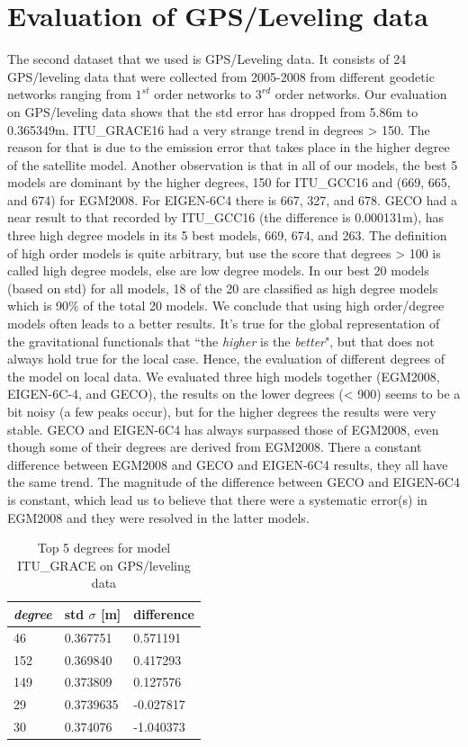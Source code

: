         \section{Evaluation of GPS/Leveling data}
        The second dataset that we used is GPS/Leveling data. It consists of 24 GPS/leveling data that were collected from 2005-2008 from different geodetic networks ranging from $1^{st}$ order networks to $3^{rd}$ order networks. Our evaluation on GPS/leveling data shows that the std error has dropped from 5.86m to 0.365349m. ITU\_GRACE16 had a very strange trend in degrees > 150. The reason for that is due to the emission error that takes place in the higher degree of the satellite model.
        Another observation is that in all of our models, the best 5 models are dominant by the higher degrees, 150 for ITU\_GCC16 and (669, 665, and 674) for EGM2008. For EIGEN-6C4 there is 667, 327, and 678. GECO had a near result to that recorded by ITU\_GCC16 (the difference is 0.000131m), has three high degree models in its 5 best models, 669, 674, and 263. The definition of high order models is quite arbitrary, but use the score that degrees > 100 is called high degree models, else are low degree models. In our best 20 models (based on std) for all models, 18 of the 20 are classified as high degree models which is 90\% of the total 20 models. We conclude that using high order/degree models often leads to a better results. It's true for the global representation of the gravitational functionals that ``the \textit{higher} is the \textit{better}", but that does not always hold true for the local case. Hence, the evaluation of different degrees of the model on local data. We evaluated three high models together (EGM2008, EIGEN-6C-4, and GECO), the results on the lower degrees (< 900) seems to be a bit noisy (a few peaks occur), but for the higher degrees the results were very stable. GECO and EIGEN-6C4 has always surpassed those of EGM2008, even though some of their degrees are derived from EGM2008. There a constant difference between EGM2008 and GECO and EIGEN-6C4 results, they all have the same trend. The magnitude of the difference between GECO and EIGEN-6C4 is constant, which lead us to believe that there were a systematic error(s) in EGM2008 and they were resolved in the latter models. 
          \begin{table}[]
          	\centering
          	\caption{Top 5 degrees for model ITU\_GRACE on GPS/leveling data}
          	\label{table:ggm_itu_grace16_gps}
          	\begin{tabular}{@{}lll@{}}
          		\toprule
          		\emph{degree} & std $\sigma$ [m]  & difference\\ \midrule
          		46 &0.367751&    0.571191\\
          		152 &0.369840&   0.417293\\
          		149 &0.373809 &  0.127576\\
          		29 &0.3739635 &  -0.027817\\
          		30 &0.374076  & -1.040373\\
          		\bottomrule
          		
          	\end{tabular}
          \end{table}
